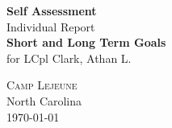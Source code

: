 \begin{titlepage}

\begin{center}

\textup{\small {\bf Self Assessment} \\ Individual Report}\\[0.2in]

\Large \textbf {Short and Long Term Goals}\\[0.5in]



\normalsize for LCpl Clark, Athan L.


\vfill

\normalsize
\textsc{Camp Lejeune}\\
North Carolina\\
\vspace{0.2cm}
\today{}

\end{center}

\end{titlepage}
